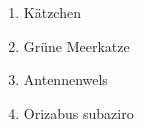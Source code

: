 \documentclass{scrartcl}
\begin{document}
\begin{enumerate} %
    \item Kätzchen
    \item Grüne Meerkatze
    \item Antennenwels
    \item Orizabus subaziro %
\end{enumerate}
\end{document}
